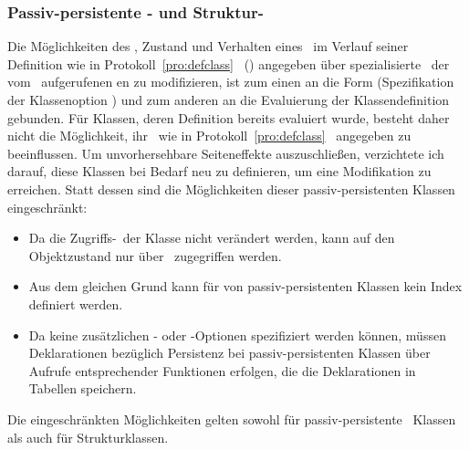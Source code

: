 \subsubsection{Passiv-persistente \protect\clos- und
Struktur-\protect\cls[n]}%
\label{sec:nrmlp}
%
Die M\"{o}glichkeiten des \mop, Zustand und Verhalten eines
\clsmo[es]\ im  Verlauf seiner Definition wie in
Protokoll~\ref{pro:defclass}
\ (\citepage{\pageref{pro:defclass}}) angegeben \"{u}ber
spezialisierte \mtd[n]\ der vom
\mop\ aufgerufenen \gfn[n]en zu modifizieren, ist zum einen an die
Form (Spezifikation der Klassenoption ) und zum
anderen an die Evaluierung der Klassendefinition gebunden.
F\"{u}r Klassen, deren Definition bereits evaluiert wurde, besteht daher
nicht die M\"{o}glichkeit, ihr \clsmo\ wie in Protokoll~\ref{pro:defclass}
\ angegeben zu beeinflussen. Um unvorhersehbare
Seiteneffekte auszuschlie\ss{}en, verzichtete ich darauf, diese Klassen
bei Bedarf neu zu definieren, um eine Modifikation zu erreichen. Statt
dessen sind die M\"{o}glichkeiten dieser passiv-persistenten Klassen
eingeschr\"{a}nkt:
\begin{itemize}
%
\item Da die Zugriffs-\mtd[n]\ der Klasse nicht ver\"{a}ndert
werden, kann auf den Objektzustand nur \"{u}ber \swizzling\ zugegriffen
werden.
%
\item Aus dem gleichen Grund kann f\"{u}r \Slt[s]\/ von
passiv-persistenten Klassen kein Index definiert werden.
%
\item Da keine zu\-s\"{a}tz\-li\-chen \cls[n]- oder \Slt\/-Optionen
spezifiziert werden k\"{o}n\-nen, m\"{u}ssen Deklarationen bez\"{u}glich
Persistenz bei passiv-persistenten Klassen \"{u}ber Aufrufe
entsprechender Funktionen erfolgen, die die Deklarationen
in Tabellen speichern.
%
\end{itemize}
%
Die eingeschr\"{a}nkten M\"{o}glichkeiten gelten sowohl f\"{u}r
passiv-persistente \clos\ Klassen als auch f\"{u}r
Strukturklassen.
%

